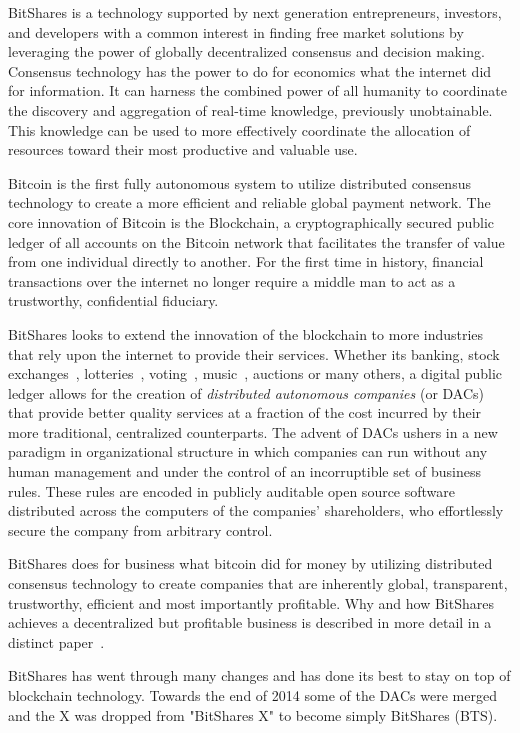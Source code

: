 BitShares is a technology supported by next generation entrepreneurs,
investors, and developers with a common interest in finding free market
solutions by leveraging the power of globally decentralized consensus and
decision making. Consensus technology has the power to do for economics what
the internet did for information. It can harness the combined power of all
humanity to coordinate the discovery and aggregation of real-time knowledge,
previously unobtainable. This knowledge can be used to more effectively
coordinate the allocation of resources toward their most productive and
valuable use.

Bitcoin is the first fully autonomous system to utilize distributed consensus
technology to create a more efficient and reliable global payment network. The
core innovation of Bitcoin is the Blockchain, a cryptographically secured
public ledger of all accounts on the Bitcoin network that facilitates the
transfer of value from one individual directly to another. For the first time
in history, financial transactions over the internet no longer require a middle
man to act as a trustworthy, confidential fiduciary.

BitShares looks to extend the innovation of the blockchain to more industries
that rely upon the internet to provide their services. Whether its banking,
stock exchanges~\cite{btst:oldwp}, lotteries~\cite{play}, voting~\cite{fmv},
music~\cite{peertracks}, auctions or many
others, a digital public ledger allows for the creation of \emph{distributed
autonomous companies} (or DACs) that provide better quality services at a
fraction of the cost incurred by their more traditional, centralized
counterparts. The advent of DACs ushers in a new paradigm in organizational
structure in which companies can run without any human management and under the
control of an incorruptible set of business rules. These rules are encoded in
publicly auditable open source software distributed across the computers of the
companies' shareholders, who effortlessly secure the company from arbitrary
control.

BitShares does for business what bitcoin did for money by utilizing distributed
consensus technology to create companies that are inherently global,
transparent, trustworthy, efficient and most importantly profitable. Why and
how BitShares achieves a decentralized but profitable business is described in
more detail in a distinct paper~\cite{bts:structure}.

BitShares has went through many changes and has done its best to stay on top of
blockchain technology. Towards the end of 2014 some of the DACs were merged and
the X was dropped from "BitShares X" to become simply BitShares (BTS).

